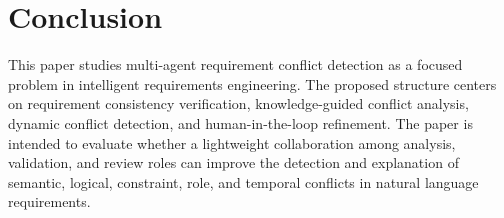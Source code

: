 \section{Conclusion}
\label{conclusion}

This paper studies multi-agent requirement conflict detection as a focused problem
in intelligent requirements engineering. The proposed structure centers on
requirement consistency verification, knowledge-guided conflict analysis, dynamic
conflict detection, and human-in-the-loop refinement. The paper is intended to
evaluate whether a lightweight collaboration among analysis, validation, and review
roles can improve the detection and explanation of semantic, logical, constraint,
role, and temporal conflicts in natural language requirements.

